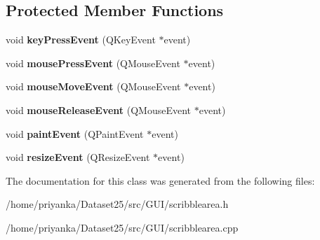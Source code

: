 \subsection*{\-Protected \-Member \-Functions}
\begin{DoxyCompactItemize}
\item 
\hypertarget{classScribbleArea_a3ed554609fd0eb635760ab75abe81479}{void {\bfseries key\-Press\-Event} (\-Q\-Key\-Event $\ast$event)}\label{classScribbleArea_a3ed554609fd0eb635760ab75abe81479}

\item 
\hypertarget{classScribbleArea_a7646e72c61ec6a1eeda468fb6dfa66f1}{void {\bfseries mouse\-Press\-Event} (\-Q\-Mouse\-Event $\ast$event)}\label{classScribbleArea_a7646e72c61ec6a1eeda468fb6dfa66f1}

\item 
\hypertarget{classScribbleArea_ae98981b6c07de07afdc39d57810e945b}{void {\bfseries mouse\-Move\-Event} (\-Q\-Mouse\-Event $\ast$event)}\label{classScribbleArea_ae98981b6c07de07afdc39d57810e945b}

\item 
\hypertarget{classScribbleArea_a991eb6ab4ac21895973bc9d81b84a30e}{void {\bfseries mouse\-Release\-Event} (\-Q\-Mouse\-Event $\ast$event)}\label{classScribbleArea_a991eb6ab4ac21895973bc9d81b84a30e}

\item 
\hypertarget{classScribbleArea_a126a30e3659f6c1cdc202f10fce7e5d9}{void {\bfseries paint\-Event} (\-Q\-Paint\-Event $\ast$event)}\label{classScribbleArea_a126a30e3659f6c1cdc202f10fce7e5d9}

\item 
\hypertarget{classScribbleArea_aaf6be24625a5f0fe1e4a3b8eecb07575}{void {\bfseries resize\-Event} (\-Q\-Resize\-Event $\ast$event)}\label{classScribbleArea_aaf6be24625a5f0fe1e4a3b8eecb07575}

\end{DoxyCompactItemize}


\-The documentation for this class was generated from the following files\-:\begin{DoxyCompactItemize}
\item 
/home/priyanka/\-Dataset25/src/\-G\-U\-I/scribblearea.\-h\item 
/home/priyanka/\-Dataset25/src/\-G\-U\-I/scribblearea.\-cpp\end{DoxyCompactItemize}
